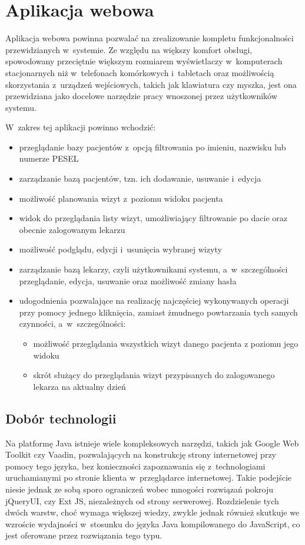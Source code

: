 \documentclass[11pt]{aghdpl}
\begin{document}
\section{Aplikacja webowa}

Aplikacja webowa powinna pozwalać na zrealizowanie kompletu funkcjonalności przewidzianych w~systemie. Ze względu na większy komfort obsługi, spowodowany przeciętnie większym rozmiarem wyświetlaczy w~komputerach stacjonarnych niż w~telefonach komórkowych i~tabletach oraz możliwością skorzystania z~urządzeń wejściowych, takich jak klawiatura czy myszka, jest ona przewidziana jako docelowe narzędzie pracy wnoszonej przez użytkowników systemu.

W~zakres tej aplikacji powinno wchodzić:
\begin{itemize}
	\item przeglądanie bazy pacjentów z~opcją filtrowania po imieniu, nazwisku lub numerze PESEL
	\item zarządzanie bazą pacjentów, tzn. ich dodawanie, usuwanie i~edycja
	\item możliwość planowania wizyt z~poziomu widoku pacjenta
	\item widok do przeglądania listy wizyt, umożliwiający filtrowanie po dacie oraz obecnie zalogowanym lekarzu
	\item możliwość podglądu, edycji i~usunięcia wybranej wizyty
	\item zarządzanie bazą lekarzy, czyli użytkownikami systemu, a~w~szczególności przeglądanie, edycja, usuwanie oraz możliwość zmiany hasła
	\item udogodnienia pozwalające na realizację najczęściej wykonywanych operacji przy pomocy jednego kliknięcia, zamiast żmudnego powtarzania tych samych czynności, a~w~szczególności:
	\begin{itemize}
		\item możliwość przeglądania wszystkich wizyt danego pacjenta z poziomu jego widoku
		\item skrót służący do przeglądania wizyt przypisanych do zalogowanego lekarza na aktualny dzień 
	\end{itemize} 
\end{itemize}

\subsection{Dobór technologii}

Na platformę Java istnieje wiele kompleksowych narzędzi, takich jak Google Web Toolkit czy Vaadin, pozwalających na konstrukcję strony internetowej przy pomocy tego języka, bez konieczności zapoznawania się z~technologiami uruchamianymi po stronie klienta w~przeglądarce internetowej. Takie podejście niesie jednak ze sobą sporo ograniczeń wobec mnogości rozwiązań pokroju jQueryUI, czy Ext JS, niezależnych od strony serwerowej. Rozdzielenie tych dwóch warstw, choć wymaga większej wiedzy, zwykle jednak również skutkuje we wzroście wydajności w~stosunku do języka Java kompilowanego do JavaScript, co jest oferowane przez rozwiązania tego typu.
\end{document}
